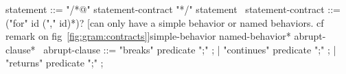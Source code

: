 \begin{syntax}
  statement ::= "/*@" statement-contract "*/" statement
  \
  statement-contract ::= {("for" id ("," id)*)?}
    {[can only have a simple behavior or named behaviors.
      cf remark on fig~\ref{fig:gram:contracts}]simple-behavior named-behavior}*
    {abrupt-clause*}
  \
  abrupt-clause ::= {"breaks" predicate ";"} ;
  | {"continues" predicate ";"} ;
  | {"returns" predicate ";"} ;
\end{syntax}

